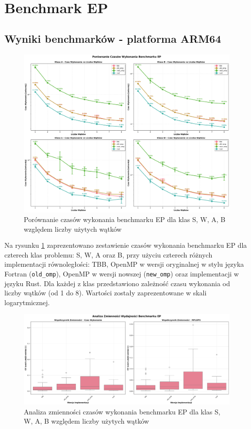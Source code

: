 
\section{Benchmark EP}
\subsection{Wyniki benchmarków - platforma ARM64}
\begin{figure}[H]
    \centering
    \includegraphics[width=\textwidth]{analiza/images/parallel/ep/arm/ep_porownanie_czasow_wykonania.png}
    \caption{Porównanie czasów wykonania benchmarku EP dla klas S, W, A, B względem liczby użytych wątków}
    \label{ep_porownanie_czasow_wykonania}
\end{figure}

Na rysunku \ref{ep_porownanie_czasow_wykonania} zaprezentowano zestawienie czasów wykonania benchmarku EP dla czterech klas problemu: S, W, A oraz B, przy użyciu czterech różnych implementacji równoległości: TBB, OpenMP w wersji oryginalnej w stylu języka Fortran (\texttt{old\_omp}), OpenMP w wersji nowszej (\texttt{new\_omp}) oraz implementacji w języku Rust. Dla każdej z klas przedstawiono zależność czasu wykonania od liczby wątków (od 1 do 8). Wartości zostały zaprezentowane w skali logarytmicznej.

\begin{figure}[H]
    \centering
    \includegraphics[width=\textwidth]{analiza/images/parallel/ep/arm/ep_analiza_zmiennosci.png}
    \caption{Analiza zmienności czasów wykonania benchmarku EP dla klas S, W, A, B względem liczby użytych wątków}
    \label{ep_analiza_zmiennosci}
\end{figure}

